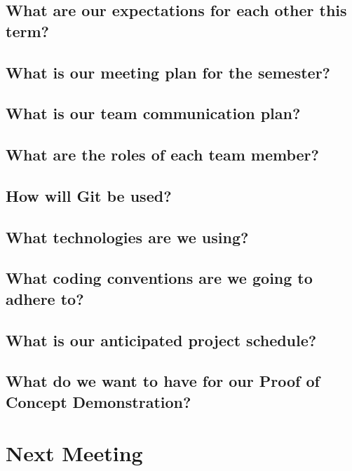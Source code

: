 \documentclass[11pt]{meetingmins}
\begin{document}
	\subsection{What are our expectations for each other this term?}
		
	\subsection{What is our meeting plan for the semester?}
		
	\subsection{What is our team communication plan?}
		
	\subsection{What are the roles of each team member?}
		
	\subsection{How will Git be used?}
		
	\subsection{What technologies are we using?}
		
	\subsection{What coding conventions are we going to adhere to?}
		
	\subsection{What is our anticipated project schedule?}
		
	\subsection{What do we want to have for our Proof of Concept Demonstration?}
		
\section{Next Meeting}
	\vspace{1em}
\end{document}
